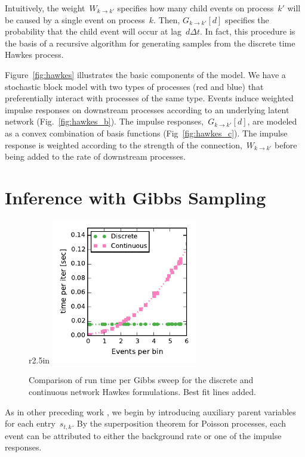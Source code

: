 Intuitively, the weight~$W_{k\to k'}$ specifies how many child events on process~$k'$ will be caused by a single event on process~$k$. 
Then, $G_{k \to k'}[d]$ specifies the probability that the child event will occur at lag~$d \Delta t$.
In fact, this procedure is the basis of a recursive algorithm for generating samples from the discrete time Hawkes process.

Figure~\ref{fig:hawkes} illustrates the basic components of the model.
We have a stochastic block model with two types of processes (red and blue) that preferentially interact with processes of the same type.
Events induce weighted impulse responses on downstream processes according to an underlying latent network (Fig.~\ref{fig:hawkes_b}).
The impulse responses,~${G_{k\to k'}[d]}$, are modeled as a convex combination of basis functions (Fig~\ref{fig:hawkes_c}).
The impulse response is weighted according to the strength of the connection,~$W_{k \to k'}$ before being added to the rate of downstream processes.

\section{Inference with Gibbs Sampling}

\begin{figure}{r}{2.5in}
  \centering
  \includegraphics[width=2.5in]{figures/ch2b/discrete_cont_comparison}
  \caption[Runtime comparison of continuous and discrete time Hawkes models]{
    Comparison of run time per Gibbs sweep for the discrete and continuous network Hawkes formulations. Best fit lines added.}
  \label{fig:disc_vs_cont}
\end{figure}

As in other preceding work \cite{Simma-2010}, we begin by introducing auxiliary parent variables for each entry~$s_{t,k}$.
By the superposition theorem for Poisson processes, each event can be attributed to either the background rate or one of the impulse responses.

